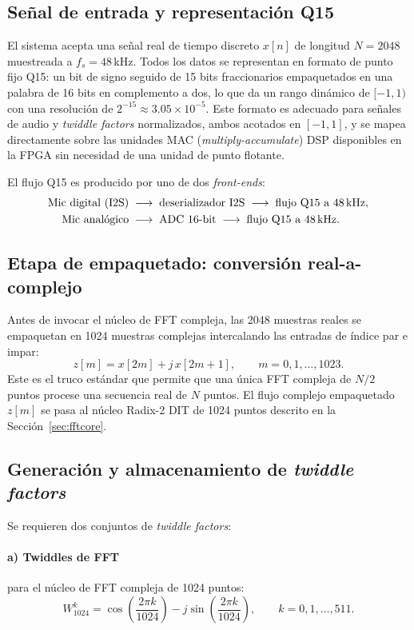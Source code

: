 \documentclass[11pt,a4paper]{article}
\begin{document}
\subsection{Señal de entrada y representación Q15}
El sistema acepta una señal real de tiempo discreto $x[n]$ de longitud
$N=2048$ muestreada a $f_s = 48$\,kHz. Todos los datos se representan en formato
de punto fijo Q15: un bit de signo seguido de 15 bits fraccionarios empaquetados
en una palabra de 16 bits en complemento a dos, lo que da un rango dinámico de
$[-1, 1)$ con una resolución de $2^{-15} \approx 3.05\times10^{-5}$. Este
formato es adecuado para señales de audio y \emph{twiddle factors} normalizados,
ambos acotados en $[-1,1]$, y se mapea directamente sobre las unidades MAC
(\emph{multiply-accumulate}) DSP disponibles en la FPGA sin necesidad de una
unidad de punto flotante.

El flujo Q15 es producido por uno de dos \emph{front-ends}:
\begin{align}
  \text{Mic digital (I2S)} &\;\longrightarrow\; \text{deserializador I2S} \;\longrightarrow\; \text{flujo Q15 a 48\,kHz}, \\
  \text{Mic analógico} &\;\longrightarrow\; \text{ADC 16-bit} \;\longrightarrow\; \text{flujo Q15 a 48\,kHz}.
\end{align}

\subsection{Etapa de empaquetado: conversión real-a-complejo}
Antes de invocar el núcleo de FFT compleja, las 2048 muestras reales se
empaquetan en 1024 muestras complejas intercalando las entradas de índice par e
impar:
\begin{equation}
  z[m] = x[2m] + j\,x[2m+1], \qquad m = 0,1,\dots,1023.
\end{equation}
Este es el truco estándar que permite que una única FFT compleja de $N/2$ puntos
procese una secuencia real de $N$ puntos. El flujo complejo empaquetado $z[m]$
se pasa al núcleo Radix-2 DIT de 1024 puntos descrito en la
Sección~\ref{sec:fftcore}.

\subsection{Generación y almacenamiento de \emph{twiddle factors}}
Se requieren dos conjuntos de \emph{twiddle factors}:

\paragraph{a) Twiddles de FFT} para el núcleo de FFT compleja de 1024 puntos:
\begin{equation}
  W_{1024}^{k} = \cos\!\left(\frac{2\pi k}{1024}\right) - j\sin\!\left(\frac{2\pi k}{1024}\right), \qquad k = 0,1,\dots,511.
\end{equation}
\end{document}

